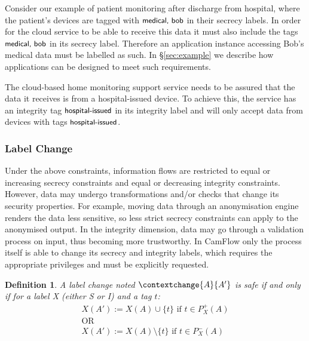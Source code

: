 \documentclass[10pt,journal,compsoc]{IEEEtran}
\newtheorem{definition}{Definition}
\begin{document}
Consider our example of patient monitoring after discharge from hospital, where the patient's devices are tagged with $\textsf{\small medical, bob}$ in their secrecy labels. In order for the cloud service to be able to receive this data it must also include the tags $\textsf{\small medical, bob}$ in its secrecy label.
Therefore an application instance accessing Bob's medical data must be labelled as such. In \S\ref{sec:example} we describe how applications can be designed to meet such requirements.
 
The cloud-based home monitoring support service needs to be assured that the data it receives is from a hospital-issued device. To achieve this, the service has an integrity tag $\textsf{\small hospital-issued}$ in its integrity label and will only accept data from devices with tags $\textsf{\small hospital-issued}$.

\subsubsection{Label Change} 
\label{sec:ifc:safe_label}

Under the above constraints, information flows are restricted to equal or increasing secrecy constraints and equal or decreasing integrity constraints.
However, data may undergo transformations and/or checks that change its security properties.
For example, moving data through an anonymisation engine renders the data less sensitive, so less strict secrecy constraints can apply to the anonymised output. 
In the integrity dimension, data may go through a validation process on input, thus becoming more trustworthy.
In CamFlow 
only the process itself is able to change its secrecy and integrity labels, which requires the appropriate privileges and must be explicitly requested. 


\begin{definition}
\label{def:label_change}
A label change noted $\contextchange{A}{A'}$ is safe if and only if for a label X (either S or I) and a tag $t$:
\begin{equation*}
\begin{multlined}
X(A'):=X(A)\cup\{t\} \text{ if } t \in P_X^+(A) \\
\text{OR}   \\
X(A'):=X(A) \setminus \{t\} \text{ if } t \in P_X^-(A) \\
\end{multlined}
\label{sec:ifc_model:ifc_rule4}
\end{equation*}
\end{definition}
\end{document}
